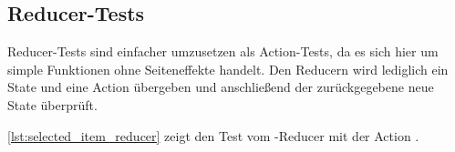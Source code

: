 \subsection{Reducer-Tests}
\label{sec:tf_reducer_tests}

Reducer-Tests sind einfacher umzusetzen als Action-Tests, da es sich hier um
simple Funktionen ohne Seiteneffekte handelt.  Den Reducern wird lediglich ein
State und eine Action übergeben und anschließend der zurückgegebene neue State
überprüft.

\cref{lst:selected_item_reducer} zeigt den Test vom -Reducer
mit der Action .


